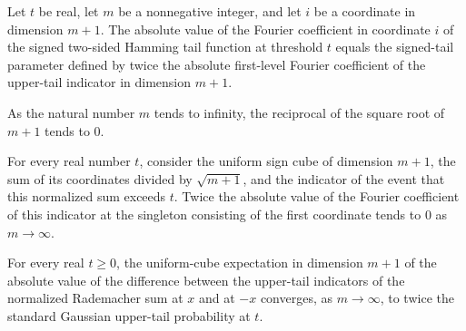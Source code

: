 \begin{theorem}
\label{FABL.abs_fourierCoeff_signedHammingTwoTail_eq_epsilon}
\leanok
{}
Let $t$ be real, let $m$ be a nonnegative integer, and let $i$ be a coordinate in
dimension $m+1$. The absolute value of the Fourier coefficient in coordinate $i$ of the
signed two-sided Hamming tail function at threshold $t$ equals the signed-tail parameter
defined by twice the absolute first-level Fourier coefficient of the upper-tail
indicator in dimension $m+1$.
\end{theorem}

\begin{theorem}
\label{FABL.tendsto_inv_sqrt_nat_succ}
\leanok
{}
As the natural number $m$ tends to infinity, the reciprocal of the square root of $m+1$
tends to $0$.
\end{theorem}

\begin{theorem}
\label{FABL.tendsto_signedHammingTwoTailEpsilon}
\leanok
{}
For every real number $t$, consider the uniform sign cube of dimension $m+1$, the sum of
its coordinates divided by $\sqrt{m+1}$, and the indicator of the event that this
normalized sum exceeds $t$. Twice the absolute value of the Fourier coefficient of this
indicator at the singleton consisting of the first coordinate tends to $0$ as
$m\to\infty$.
\end{theorem}

\begin{theorem}
\label{FABL.tendsto_expect_abs_signedHammingTwoTail}
\leanok
{}
For every real $t\ge0$, the uniform-cube expectation in dimension $m+1$ of the absolute
value of the difference between the upper-tail indicators of the normalized Rademacher
sum at $x$ and at $-x$ converges, as $m\to\infty$, to twice the standard Gaussian
upper-tail probability at $t$.
\end{theorem}

